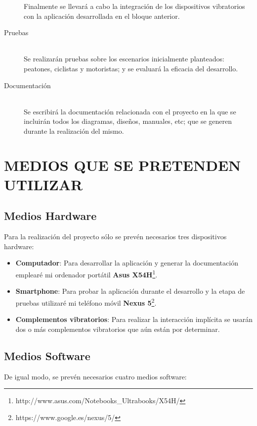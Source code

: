\documentclass{pre-tfg}
\begin{document}
\begin{description}
  Finalmente se llevará a cabo la integración de los dispositivos vibratorios con la
  aplicación desarrollada en el bloque anterior.

\item[Pruebas] \hfill \\
  Se realizarán pruebas sobre los escenarios inicialmente planteados: peatones, ciclistas
  y motoristas; y se evaluará la eficacia del desarrollo.

\item[Documentación] \hfill \\
  Se escribirá la documentación relacionada con el proyecto en la que se incluirán todos
  los diagramas, diseños, manuales, etc; que se generen durante la realización del mismo.

\end{description}

\newpage

\section{MEDIOS QUE SE PRETENDEN UTILIZAR}

\subsection{Medios Hardware}

Para la realización del proyecto sólo se prevén necesarios tres dispositivos hardware:

\begin{itemize}
\item \textbf{Computador}: Para desarrollar la aplicación y generar la documentación
  emplearé mi ordenador portátil \textbf{Asus
    X54H}\footnote{http://www.asus.com/Notebooks\_Ultrabooks/X54H/}.
\item \textbf{Smartphone}: Para probar la aplicación durante el desarrollo y la etapa de
  pruebas utilizaré mi teléfono móvil \textbf{Nexus
    5}\footnote{https://www.google.es/nexus/5/}.
\item \textbf{Complementos vibratorios}: Para realizar la interacción implícita se usarán
  dos o más complementos vibratorios que aún están por determinar.
\end{itemize}

\subsection{Medios Software}

De igual modo, se prevén necesarios cuatro medios software:
\end{document}

